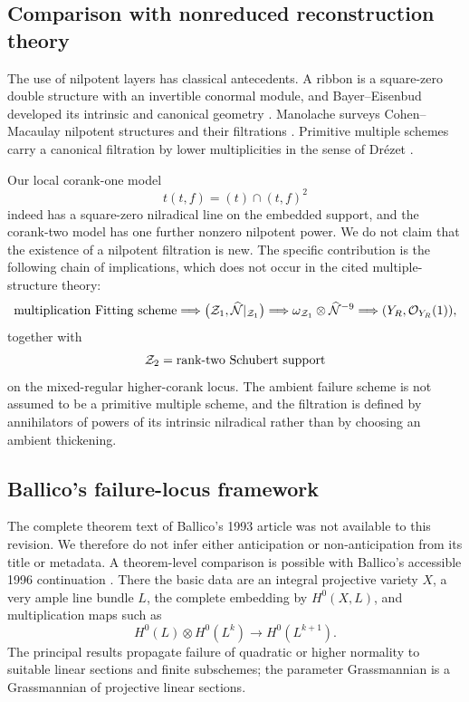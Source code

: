 \subsection{Comparison with nonreduced reconstruction theory}

The use of nilpotent layers has classical antecedents.  A ribbon is a
square-zero double structure with an invertible conormal module, and
Bayer--Eisenbud developed its intrinsic and canonical geometry
\cite{BayerEisenbud}.  Manolache surveys Cohen--Macaulay nilpotent
structures and their filtrations \cite{Manolache}.  Primitive multiple
schemes carry a canonical filtration by lower multiplicities in the
sense of Drézet \cite{Drezet}.

Our local corank-one model
\[
 t(t,f)=(t)\cap(t,f)^2
\]
indeed has a square-zero nilradical line on the embedded support, and
the corank-two model has one further nonzero nilpotent power.  We do
not claim that the existence of a nilpotent filtration is new.  The
specific contribution is the following chain of implications, which
does not occur in the cited multiple-structure theory:
\[
 \text{multiplication Fitting scheme}
 \Longrightarrow
 \bigl(\mathcal Z_1,\widehat{\mathcal N}|_{\mathcal Z_1}\bigr)
 \Longrightarrow
 \omega_{\mathcal Z_1}\otimes\widehat{\mathcal N}^{-9}
 \Longrightarrow
 (Y_R,\mathcal O_{Y_R}(1)),
\]
together with
\[
 \mathcal Z_2=\text{rank-two Schubert support}
\]
on the mixed-regular higher-corank locus.  The ambient failure scheme
is not assumed to be a primitive multiple scheme, and the filtration
is defined by annihilators of powers of its intrinsic nilradical
rather than by choosing an ambient thickening.

\subsection{Ballico's failure-locus framework}

The complete theorem text of Ballico's 1993 article
\cite{Ballico93} was not available to this revision.  We therefore do
not infer either anticipation or non-anticipation from its title or
metadata.  A theorem-level comparison is possible with Ballico's
accessible 1996 continuation \cite{Ballico96}.  There the basic data
are an integral projective variety $X$, a very ample line bundle $L$,
the complete embedding by $H^0(X,L)$, and multiplication maps such as
\[
 H^0(L)\otimes H^0(L^k)\longrightarrow H^0(L^{k+1}).
\]
The principal results propagate failure of quadratic or higher
normality to suitable linear sections and finite subschemes; the
parameter Grassmannian is a Grassmannian of projective linear
sections.

